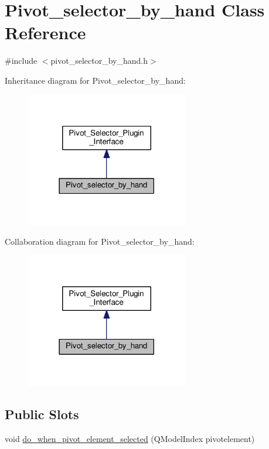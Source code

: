 \hypertarget{classPivot__selector__by__hand}{}\section{Pivot\+\_\+selector\+\_\+by\+\_\+hand Class Reference}
\label{classPivot__selector__by__hand}


{\ttfamily \#include $<$pivot\+\_\+selector\+\_\+by\+\_\+hand.\+h$>$}



Inheritance diagram for Pivot\+\_\+selector\+\_\+by\+\_\+hand\+:\nopagebreak
\begin{figure}[H]
\begin{center}
\leavevmode
\includegraphics[width=201pt]{classPivot__selector__by__hand__inherit__graph}
\end{center}
\end{figure}


Collaboration diagram for Pivot\+\_\+selector\+\_\+by\+\_\+hand\+:\nopagebreak
\begin{figure}[H]
\begin{center}
\leavevmode
\includegraphics[width=201pt]{classPivot__selector__by__hand__coll__graph}
\end{center}
\end{figure}
\subsection*{Public Slots}
\begin{DoxyCompactItemize}
\item 
void \hyperlink{classPivot__selector__by__hand_a2ee01f0ccc6ad957a46e4d6ecd891645}{do\+\_\+when\+\_\+pivot\+\_\+element\+\_\+selected} (Q\+Model\+Index pivotelement)
\end{DoxyCompactItemize}
